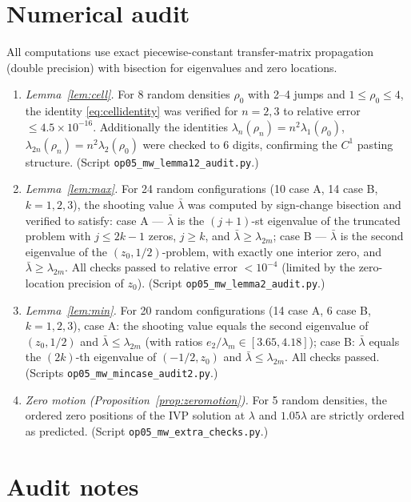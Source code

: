 ﻿\documentclass[11pt]{article}
\begin{document}
\section{Numerical audit}

All computations use exact piecewise-constant transfer-matrix propagation
(double precision) with bisection for eigenvalues and zero locations.

\begin{enumerate}[leftmargin=1.6em]
	\item \emph{Lemma~\ref{lem:cell}.}  For 8 random densities
	$\rho_0$ with 2--4 jumps and $1\le\rho_0\le 4$, the identity
	\eqref{eq:cellidentity} was verified for $n=2,3$ to relative error
	$\le 4.5\times10^{-16}$.  Additionally the identities
	$\lambda_n(\rho_n)=n^2\lambda_1(\rho_0)$,
	$\lambda_{2n}(\rho_n)=n^2\lambda_2(\rho_0)$ were checked to 6 digits,
	confirming the $C^1$ pasting structure.  (Script
	\texttt{op05\_mw\_lemma12\_audit.py}.)
	\item \emph{Lemma~\ref{lem:max}.}  For 24 random configurations
	(10 case A, 14 case B, $k=1,2,3$), the shooting value
	$\bar\lambda$ was computed by sign-change bisection and verified to
	satisfy: case A --- $\bar\lambda$ is the $(j+1)$-st eigenvalue of the
	truncated problem with $j\le 2k-1$ zeros, $j\ge k$, and
	$\bar\lambda\ge\lambda_{2m}$; case B --- $\bar\lambda$ is the second
	eigenvalue of the $(z_0,1/2)$-problem, with exactly one interior zero,
	and $\bar\lambda\ge\lambda_{2m}$.  All checks passed to relative error
	$<10^{-4}$ (limited by the zero-location precision of $z_0$).
	(Script \texttt{op05\_mw\_lemma2\_audit.py}.)
	\item \emph{Lemma~\ref{lem:min}.}  For 20 random configurations
	(14 case A, 6 case B, $k=1,2,3$), case A: the shooting value equals
	the second eigenvalue of $(z_0,1/2)$ and $\bar\lambda\le\lambda_{2m}$
	(with ratios $e_2/\lambda_m\in[3.65,4.18]$);
	case B: $\bar\lambda$ equals the $(2k)$-th eigenvalue of
	$(-1/2,z_0)$ and $\bar\lambda\le\lambda_{2m}$.  All checks passed.
	(Scripts \texttt{op05\_mw\_mincase\_audit2.py}.)
	\item \emph{Zero motion (Proposition~\ref{prop:zeromotion}).}
	For 5 random densities, the ordered zero positions of the IVP solution
	at $\lambda$ and $1.05\lambda$ are strictly ordered as predicted.
	(Script \texttt{op05\_mw\_extra\_checks.py}.)
\end{enumerate}

\section{Audit notes}
\end{document}
